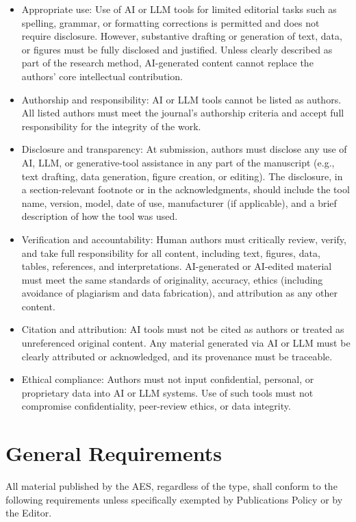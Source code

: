 \documentclass[fleqn]{jaes}
\begin{document}
\begin{itemize}
  \item Appropriate use:
  Use of AI or LLM tools for limited editorial tasks such as spelling, grammar, or formatting corrections is permitted and does not require disclosure. However, substantive drafting or generation of text, data, or figures must be fully disclosed and justified.
  Unless clearly described as part of the research method, AI-generated content cannot replace the authors’ core intellectual contribution.
  
  \item Authorship and responsibility:
  AI or LLM tools cannot be listed as authors. All listed authors must meet the journal’s authorship criteria and accept full responsibility for the integrity of the work.
  
  \item Disclosure and transparency:
  At submission, authors must disclose any use of AI, LLM, or generative-tool assistance in any part of the manuscript (e.g., text drafting, data generation, figure creation, or editing). The disclosure, in a section-relevant footnote or in the acknowledgments, should include the tool name, version, model, date of use, manufacturer (if applicable), and a brief description of how the tool was used.

  \item Verification and accountability:
  Human authors must critically review, verify, and take full responsibility for all content, including text, figures, data, tables, references, and interpretations. AI-generated or AI-edited material must meet the same standards of originality, accuracy, ethics (including avoidance of plagiarism and data fabrication), and attribution as any other content.

  \item Citation and attribution:
  AI tools must not be cited as authors or treated as unreferenced original content.   Any material generated via AI or LLM must be clearly attributed or acknowledged, and its provenance must be traceable.

  \item Ethical compliance:
  Authors must not input confidential, personal, or proprietary data into AI or LLM systems.
  Use of such tools must not compromise confidentiality, peer-review ethics, or data integrity.
\end{itemize}

\section{General Requirements}\label{sec:general}
All material published by the AES, regardless of the type, shall conform to the following requirements unless specifically exempted by Publications Policy or by the Editor.
\end{document}
